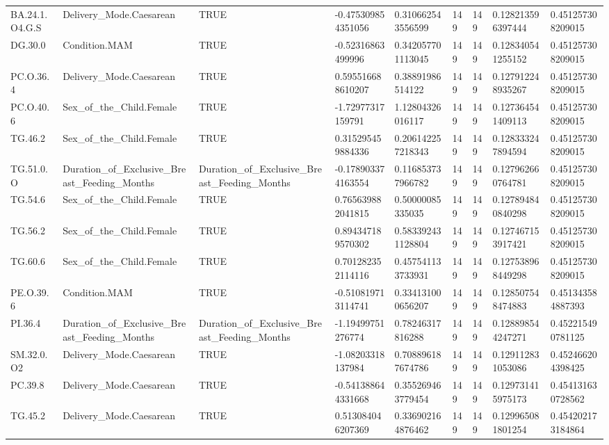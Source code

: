 \begin{longtable}{lllllllll}
BA.24.1.O4.G.S & Delivery\_Mode.Caesarean & TRUE & -0.475309854351056 & 0.310662543556599 & 149 & 149 & 0.128213596397444 & 0.451257308209015 \\
DG.30.0 & Condition.MAM & TRUE & -0.52316863499996 & 0.342057701113045 & 149 & 149 & 0.128340541255152 & 0.451257308209015 \\
PC.O.36.4 & Delivery\_Mode.Caesarean & TRUE & 0.595516688610207 & 0.38891986514122 & 149 & 149 & 0.127912248935267 & 0.451257308209015 \\
PC.O.40.6 & Sex\_of\_the\_Child.Female & TRUE & -1.72977317159791 & 1.12804326016117 & 149 & 149 & 0.127364541409113 & 0.451257308209015 \\
TG.46.2 & Sex\_of\_the\_Child.Female & TRUE & 0.315295459884336 & 0.206142257218343 & 149 & 149 & 0.128333247894594 & 0.451257308209015 \\
TG.51.0.O & Duration\_of\_Exclusive\_Breast\_Feeding\_Months & Duration\_of\_Exclusive\_Breast\_Feeding\_Months & -0.178903374163554 & 0.116853737966782 & 149 & 149 & 0.127962660764781 & 0.451257308209015 \\
TG.54.6 & Sex\_of\_the\_Child.Female & TRUE & 0.765639882041815 & 0.50000085335035 & 149 & 149 & 0.127894840840298 & 0.451257308209015 \\
TG.56.2 & Sex\_of\_the\_Child.Female & TRUE & 0.894347189570302 & 0.583392431128804 & 149 & 149 & 0.127467153917421 & 0.451257308209015 \\
TG.60.6 & Sex\_of\_the\_Child.Female & TRUE & 0.701282352114116 & 0.457541133733931 & 149 & 149 & 0.127538968449298 & 0.451257308209015 \\
PE.O.39.6 & Condition.MAM & TRUE & -0.510819713114741 & 0.334131000656207 & 149 & 149 & 0.128507548474883 & 0.451343584887393 \\
PI.36.4 & Duration\_of\_Exclusive\_Breast\_Feeding\_Months & Duration\_of\_Exclusive\_Breast\_Feeding\_Months & -1.19499751276774 & 0.78246317816288 & 149 & 149 & 0.128898544247271 & 0.452215490781125 \\
SM.32.0.O2 & Delivery\_Mode.Caesarean & TRUE & -1.08203318137984 & 0.708896187674786 & 149 & 149 & 0.129112831053086 & 0.452466204398425 \\
PC.39.8 & Delivery\_Mode.Caesarean & TRUE & -0.541388644331668 & 0.355269463779454 & 149 & 149 & 0.129731415975173 & 0.454131630728562 \\
TG.45.2 & Delivery\_Mode.Caesarean & TRUE & 0.513084046207369 & 0.336902164876462 & 149 & 149 & 0.129965081801254 & 0.454202173184864 \\

\end{longtable}
